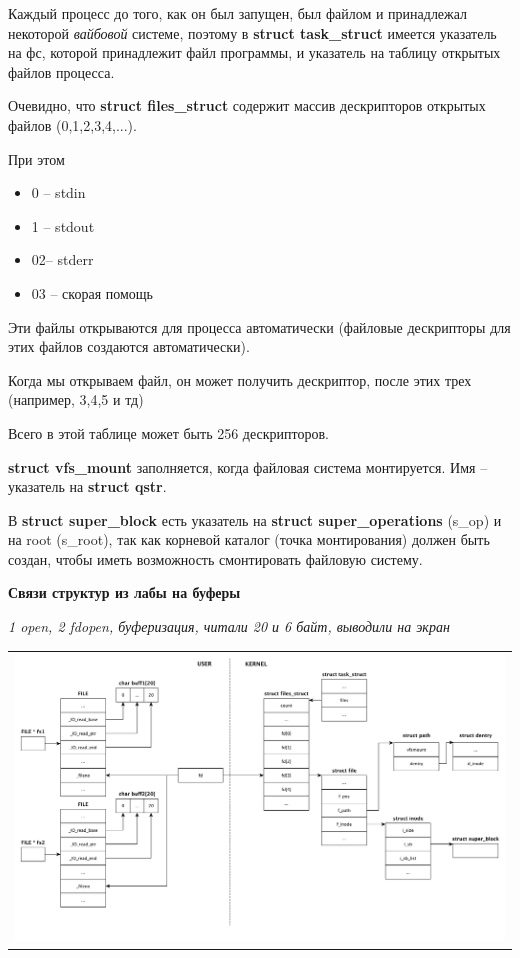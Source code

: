 \par Каждый процесс до того, как он был запущен, был файлом и принадлежал некоторой \textit{вайбовой} системе, поэтому в \textbf{struct task\_struct} имеется указатель на фс, которой принадлежит файл программы, и указатель на таблицу открытых файлов процесса.
\par Очевидно, что \textbf{struct files\_struct} содержит массив дескрипторов открытых файлов (0,1,2,3,4,...).
\par При этом 
\begin{itemize}
\item 0 -- stdin
\item 1 -- stdout
\item 02-- stderr
\item 03 -- скорая помощь
\end{itemize}
\par Эти файлы открываются для процесса автоматически (файловые дескрипторы для этих файлов создаются автоматически).
\par Когда мы открываем файл, он может получить дескриптор, после этих трех (например, 3,4,5 и тд)
\par Всего в этой таблице может быть 256 дескрипторов.
\par \textbf{struct vfs\_mount} заполняется, когда файловая система монтируется. Имя -- указатель на \textbf{struct qstr}.
\par В \textbf{struct super\_block} есть указатель на \textbf{struct super\_operations} (s\_op) и на root (s\_root), так как корневой каталог (точка монтирования) должен быть создан, чтобы иметь возможность смонтировать файловую систему.

\textbf{Связи структур из лабы на буферы}

\textit{1 open, 2 fdopen, буферизация, читали 20 и 6 байт, выводили на экран}
\begin{table}[H]
  \centering
  \begin{tabular}{p{1\linewidth}}
    \centering
    \includegraphics[width=0.8\linewidth]{./images/scheme1.pdf}
  \end{tabular}
\end{table}

